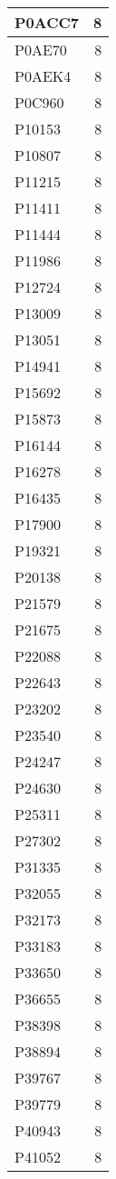 \documentclass[
]{book}
\theoremstyle{definition}
\theoremstyle{definition}
\theoremstyle{definition}
\theoremstyle{definition}
\theoremstyle{remark}
\begin{document}
\begin{table}
\begin{tabular}{l|r}
\hline
P0ACC7 & 8\\
\hline
P0AE70 & 8\\
\hline
P0AEK4 & 8\\
\hline
P0C960 & 8\\
\hline
P10153 & 8\\
\hline
P10807 & 8\\
\hline
P11215 & 8\\
\hline
P11411 & 8\\
\hline
P11444 & 8\\
\hline
P11986 & 8\\
\hline
P12724 & 8\\
\hline
P13009 & 8\\
\hline
P13051 & 8\\
\hline
P14941 & 8\\
\hline
P15692 & 8\\
\hline
P15873 & 8\\
\hline
P16144 & 8\\
\hline
P16278 & 8\\
\hline
P16435 & 8\\
\hline
P17900 & 8\\
\hline
P19321 & 8\\
\hline
P20138 & 8\\
\hline
P21579 & 8\\
\hline
P21675 & 8\\
\hline
P22088 & 8\\
\hline
P22643 & 8\\
\hline
P23202 & 8\\
\hline
P23540 & 8\\
\hline
P24247 & 8\\
\hline
P24630 & 8\\
\hline
P25311 & 8\\
\hline
P27302 & 8\\
\hline
P31335 & 8\\
\hline
P32055 & 8\\
\hline
P32173 & 8\\
\hline
P33183 & 8\\
\hline
P33650 & 8\\
\hline
P36655 & 8\\
\hline
P38398 & 8\\
\hline
P38894 & 8\\
\hline
P39767 & 8\\
\hline
P39779 & 8\\
\hline
P40943 & 8\\
\hline
P41052 & 8\\

\end{tabular}
\end{table}
\end{document}
